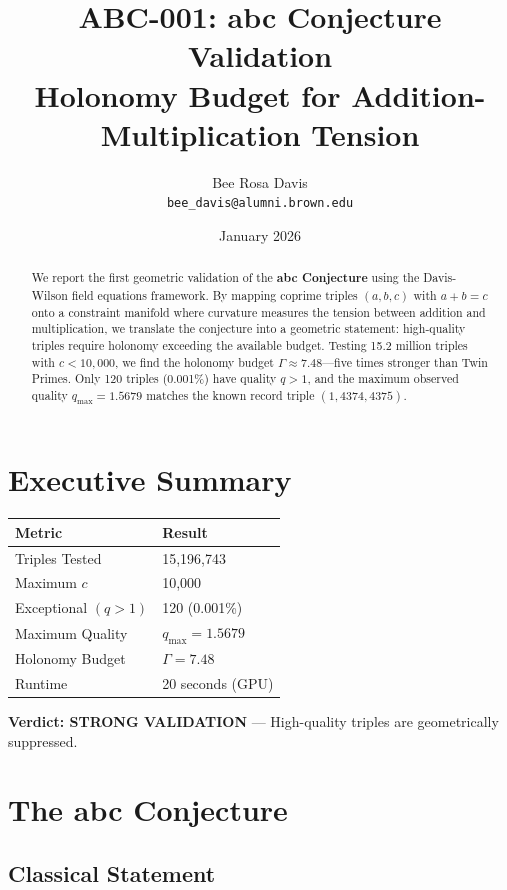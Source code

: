 \documentclass[12pt]{article}
\title{\textbf{ABC-001: abc Conjecture Validation}\\[0.5em]\large Holonomy Budget for Addition-Multiplication Tension}
\author{Bee Rosa Davis\\\texttt{bee\_davis@alumni.brown.edu}}
\date{January 2026}
\begin{document}
\maketitle

\begin{abstract}
We report the first geometric validation of the \textbf{abc Conjecture} using the Davis-Wilson field equations framework. By mapping coprime triples $(a,b,c)$ with $a+b=c$ onto a constraint manifold where curvature measures the tension between addition and multiplication, we translate the conjecture into a geometric statement: high-quality triples require holonomy exceeding the available budget. Testing 15.2 million triples with $c < 10{,}000$, we find the holonomy budget $\Gamma \approx 7.48$---five times stronger than Twin Primes. Only 120 triples (0.001\%) have quality $q > 1$, and the maximum observed quality $q_{\max} = 1.5679$ matches the known record triple $(1, 4374, 4375)$.
\end{abstract}

\section{Executive Summary}

\begin{center}
\begin{tabular}{ll}
\toprule
\textbf{Metric} & \textbf{Result} \\
\midrule
Triples Tested & 15,196,743 \\
Maximum $c$ & 10,000 \\
Exceptional $(q > 1)$ & 120 (0.001\%) \\
Maximum Quality & $q_{\max} = 1.5679$ \\
Holonomy Budget & $\Gamma = 7.48$ \\
Runtime & 20 seconds (GPU) \\
\bottomrule
\end{tabular}
\end{center}

\noindent\textbf{Verdict: STRONG VALIDATION} --- High-quality triples are geometrically suppressed.

\section{The abc Conjecture}

\subsection{Classical Statement}
\end{document}
